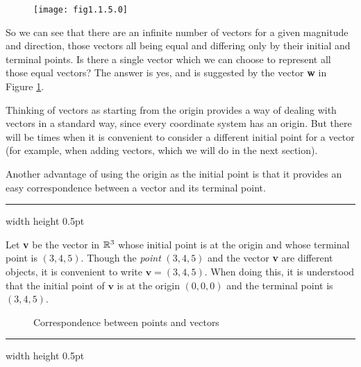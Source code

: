 \begin{figure}[h]
 \begin{center}
  \texttt{[image: fig1.1.5.0]}
 \end{center}
 \caption[]{}
 \label{fig:veceq}
\end{figure}

So we can see that there are an infinite number of vectors for a given magnitude and direction, those vectors all
being equal and differing only by their initial and terminal points.  Is there a single vector which we can choose to
represent all those equal vectors?  The answer is yes, and is suggested by the vector \textbf{w} in Figure
\ref{fig:veceq}.
\newpage
{}

\vspace{3mm}
Thinking of vectors as starting from the origin provides a way of dealing with vectors in a standard way, since every
coordinate system has an origin.  But there
will be times when it is convenient to consider a different initial point for a vector (for example, when adding
vectors, which we will do in the next section).

Another advantage of using the origin as the initial point is that it provides an easy correspondence between a
vector and its terminal point.

\vspace{4mm}
\hrule width \textwidth height 0.5pt
\begin{exmp}
 Let \textbf{v} be the vector in $\mathbb{R}^{3}$ whose initial point is at the origin and whose terminal point
 is $(3,4,5)$.  Though the \emph{point} $(3,4,5)$ and the vector \textbf{v} are different objects, it is
 convenient to write $\textbf{v} = (3,4,5)$.  When doing this, it is understood that the initial point of $\textbf{v}$
 is at the origin $(0,0,0)$ and the terminal point is $(3,4,5)$.
\end{exmp}

\begin{figure}[h]
 \centering
 \qquad\qquad
 \caption[]{\quad Correspondence between points and vectors}
 \label{fig:corresp}
\end{figure}
\hrule width \textwidth height 0.5pt
\vspace{4mm}

